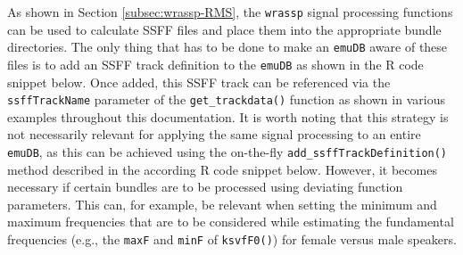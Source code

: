 \documentclass[
]{book}
\newenvironment{Shaded}{\begin{snugshade}}{\end{snugshade}}
\newcommand{\AttributeTok}[1]{\textcolor[rgb]{0.77,0.63,0.00}{#1}}
\newcommand{\CommentTok}[1]{\textcolor[rgb]{0.56,0.35,0.01}{\textit{#1}}}
\newcommand{\DecValTok}[1]{\textcolor[rgb]{0.00,0.00,0.81}{#1}}
\newcommand{\FunctionTok}[1]{\textcolor[rgb]{0.00,0.00,0.00}{#1}}
\newcommand{\NormalTok}[1]{#1}
\newcommand{\OtherTok}[1]{\textcolor[rgb]{0.56,0.35,0.01}{#1}}
\newcommand{\SpecialCharTok}[1]{\textcolor[rgb]{0.00,0.00,0.00}{#1}}
\newcommand{\StringTok}[1]{\textcolor[rgb]{0.31,0.60,0.02}{#1}}
\begin{document}
As shown in Section \ref{subsec:wrassp-RMS}, the \texttt{wrassp} signal processing functions can be used to calculate SSFF files and place them into the appropriate bundle directories. The only thing that has to be done to make an \texttt{emuDB} aware of these files is to add an SSFF track definition to the \texttt{emuDB} as shown in the R code snippet below. Once added, this SSFF track can be referenced via the \texttt{ssffTrackName} parameter of the \texttt{get\_trackdata()} function as shown in various examples throughout this documentation. It is worth noting that this strategy is not necessarily relevant for applying the same signal processing to an entire \texttt{emuDB}, as this can be achieved using the on-the-fly \texttt{add\_ssffTrackDefinition()} method described in the according R code snippet below. However, it becomes necessary if certain bundles are to be processed using deviating function parameters. This can, for example, be relevant when setting the minimum and maximum frequencies that are to be considered while estimating the fundamental frequencies (e.g., the \texttt{maxF} and \texttt{minF} of \texttt{ksvfF0()}) for female versus male speakers.

\begin{Shaded}
\end{Shaded}
\end{document}
